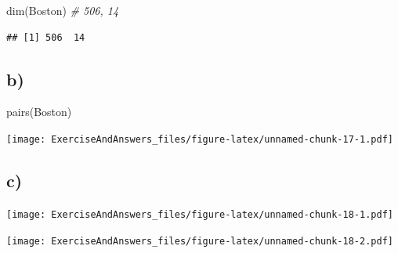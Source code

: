 \documentclass[
]{article}
\newenvironment{Shaded}{\begin{snugshade}}{\end{snugshade}}
\newcommand{\CommentTok}[1]{\textcolor[rgb]{0.56,0.35,0.01}{\textit{#1}}}
\newcommand{\FunctionTok}[1]{\textcolor[rgb]{0.00,0.00,0.00}{#1}}
\newcommand{\NormalTok}[1]{#1}
\newcommand{\SpecialCharTok}[1]{\textcolor[rgb]{0.00,0.00,0.00}{#1}}
\begin{document}
\begin{Shaded}
\begin{Highlighting}[]
\FunctionTok{dim}\NormalTok{(Boston) }\CommentTok{\# 506, 14}
\end{Highlighting}
\end{Shaded}

\begin{verbatim}
## [1] 506  14
\end{verbatim}

\hypertarget{b-7}{%
\subsection{b)}\label{b-7}}

\begin{Shaded}
\begin{Highlighting}[]
\FunctionTok{pairs}\NormalTok{(Boston)}
\end{Highlighting}
\end{Shaded}

\texttt{[image: ExerciseAndAnswers\_files/figure-latex/unnamed-chunk-17-1.pdf]}

\hypertarget{c-6}{%
\subsection{c)}\label{c-6}}

\begin{Shaded}
\end{Shaded}

\texttt{[image: ExerciseAndAnswers\_files/figure-latex/unnamed-chunk-18-1.pdf]}

\begin{Shaded}
\end{Shaded}

\texttt{[image: ExerciseAndAnswers\_files/figure-latex/unnamed-chunk-18-2.pdf]}

\begin{Shaded}
\end{Shaded}
\end{document}
